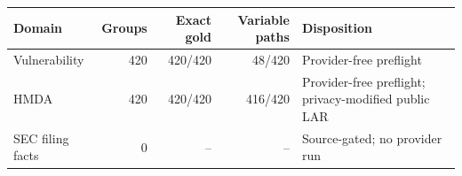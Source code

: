 \begin{tabularx}{\linewidth}{@{}l r r r >{\raggedright\arraybackslash}X@{}}
\toprule
Domain & Groups & Exact gold & Variable paths & Disposition \\
\midrule
Vulnerability & 420 & 420/420 & 48/420 & Provider-free preflight \\
HMDA & 420 & 420/420 & 416/420 & Provider-free preflight; privacy-modified public LAR \\
SEC filing facts & 0 & -- & -- & Source-gated; no provider run \\
\bottomrule
\end{tabularx}
